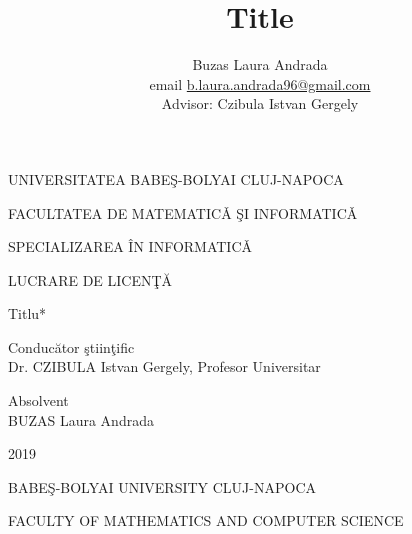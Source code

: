 \documentclass[12pt]{extreport}
\title{Title}
\author{
        Buzas Laura Andrada
        \\ email \href{mailto:b.laura.andrada96@gmail.com}{b.laura.andrada96@gmail.com}
        \\ [1cm]{\normalsize Advisor: Czibula Istvan Gergely }
    }
\date{}
\begin{document}

    \pagestyle{empty}
    \begin{titlepage}

        \begin{center}
        {\Large UNIVERSITATEA BABEŞ-BOLYAI CLUJ-NAPOCA}
        \end{center}
    
        \begin{center}
        {\Large FACULTATEA DE MATEMATICǍ ŞI INFORMATICǍ}
        \end{center}
    
        \begin{center}
        {\Large SPECIALIZAREA ÎN INFORMATICǍ}
        \end{center}
    
        \vfill
    
        \begin{center}
        {\LARGE LUCRARE DE LICENŢĂ}
        \end{center}
    
        \begin{center}
        {\Huge *Titlu*}
        \end{center}
    
        \vfill
    
        \begin{flushleft}
        {\LARGE Conducător ştiinţific  \\ Dr. CZIBULA Istvan Gergely, Profesor Universitar}
        \end{flushleft}
    
        \begin{flushright}
        {\Large Absolvent \\ BUZAS Laura Andrada}
        \end{flushright}
    
        \vfill
    
        \begin{center}
        {\LARGE 2019}
        \end{center}

        \pagebreak

        \begin{center}
        {\Large BABEŞ-BOLYAI UNIVERSITY CLUJ-NAPOCA}
        \end{center}

        \begin{center}
        {\Large FACULTY OF MATHEMATICS AND COMPUTER SCIENCE}
        \end{center}


\end{titlepage}
\end{document}
